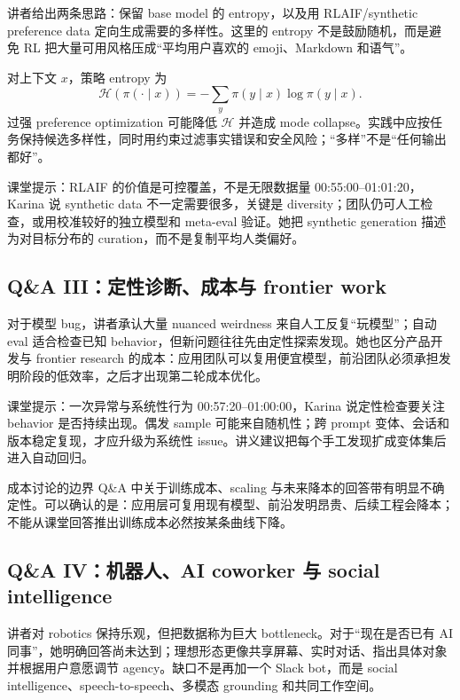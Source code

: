 讲者给出两条思路：保留 base model 的 entropy，以及用 RLAIF/synthetic preference data 定向生成需要的多样性。这里的 entropy 不是鼓励随机，而是避免 RL 把大量可用风格压成“平均用户喜欢的 emoji、Markdown 和语气”。

对上下文 $x$，策略 entropy 为
\[
\mathcal{H}(\pi(\cdot\mid x))=-\sum_y \pi(y\mid x)\log \pi(y\mid x).
\]
过强 preference optimization 可能降低 $\mathcal{H}$ 并造成 mode collapse。实践中应按任务保持候选多样性，同时用约束过滤事实错误和安全风险；“多样”不是“任何输出都好”。

\begin{importantbox}{课堂提示：RLAIF 的价值是可控覆盖，不是无限数据量}
00:55:00--01:01:20，Karina 说 synthetic data 不一定需要很多，关键是 diversity；团队仍可人工检查，或用校准较好的独立模型和 meta-eval 验证。她把 synthetic generation 描述为对目标分布的 curation，而不是复制平均人类偏好。
\end{importantbox}

\subsection{Q\&A III：定性诊断、成本与 frontier work}

对于模型 bug，讲者承认大量 nuanced weirdness 来自人工反复“玩模型”；自动 eval 适合检查已知 behavior，但新问题往往先由定性探索发现。她也区分产品开发与 frontier research 的成本：应用团队可以复用便宜模型，前沿团队必须承担发明阶段的低效率，之后才出现第二轮成本优化。

\begin{knowledgebox}{课堂提示：一次异常与系统性行为}
00:57:20--01:00:00，Karina 说定性检查要关注 behavior 是否持续出现。偶发 sample 可能来自随机性；跨 prompt 变体、会话和版本稳定复现，才应升级为系统性 issue。讲义建议把每个手工发现扩成变体集后进入自动回归。
\end{knowledgebox}

\begin{warningbox}{成本讨论的边界}
Q\&A 中关于训练成本、scaling 与未来降本的回答带有明显不确定性。可以确认的是：应用层可复用现有模型、前沿发明昂贵、后续工程会降本；不能从课堂回答推出训练成本必然按某条曲线下降。
\end{warningbox}

\subsection{Q\&A IV：机器人、AI coworker 与 social intelligence}

讲者对 robotics 保持乐观，但把数据称为巨大 bottleneck。对于“现在是否已有 AI 同事”，她明确回答尚未达到；理想形态更像共享屏幕、实时对话、指出具体对象并根据用户意愿调节 agency。缺口不是再加一个 Slack bot，而是 social intelligence、speech-to-speech、多模态 grounding 和共同工作空间。

